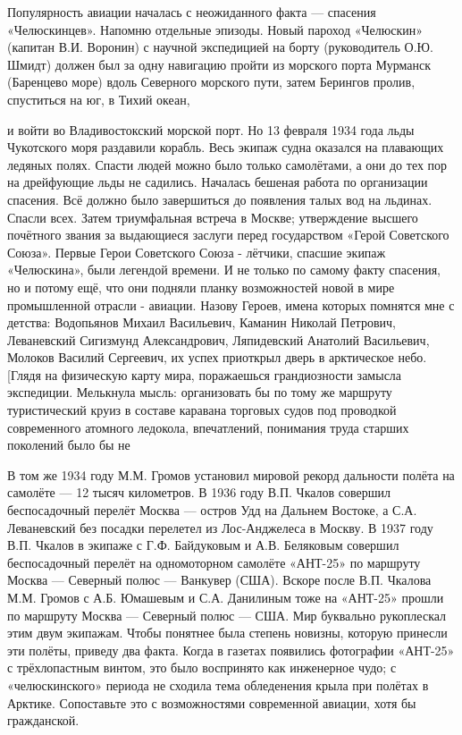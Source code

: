 Популярность авиации началась с неожиданного факта — спасения «Челюскинцев». Напомню отдельные эпизоды. Новый пароход «Челюскин» (капитан В.И. Воронин) с научной экспедицией на борту (руководитель О.Ю. Шмидт) должен был за одну навигацию пройти из морского порта Мурманск (Баренцево море) вдоль Северного морского пути, затем Берингов пролив, спуститься на юг, в Тихий океан,

\label{174-1}
и войти во Владивостокский морской порт. Но 13 февраля 1934 года льды Чукотского моря раздавили корабль. Весь экипаж судна оказался на плавающих ледяных полях. Спасти людей можно было только самолётами, а они до тех пор на дрейфующие льды не садились. Началась бешеная работа по организации спасения. Всё должно было завершиться до появления талых вод на льдинах. Спасли всех. Затем триумфальная встреча в Москве; утверждение высшего почётного звания за выдающиеся заслуги перед государством «Герой Советского Союза». Первые Герои Советского Союза - лётчики, спасшие экипаж «Челюскина», были легендой времени. И не только по самому факту спасения, но и потому ещё, что они подняли планку возможностей новой в мире промышленной отрасли - авиации. Назову Героев, имена которых помнятся мне с детства: Водопьянов Михаил Васильевич, Каманин Николай Петрович, Леваневский Сигизмунд Александрович, Ляпидевский Анатолий Васильевич, Молоков Василий Сергеевич, их успех приоткрыл дверь в арктическое небо. [Глядя на физическую карту мира, поражаешься грандиозности замысла экспедиции. Мелькнула мысль: организовать бы по тому же маршруту туристический круиз в составе каравана торговых судов под проводкой современного атомного ледокола, впечатлений, понимания труда старших поколений было бы не

\label{175-1}
В том же 1934 году М.М. Громов установил мировой рекорд дальности полёта на самолёте — 12 тысяч километров. В 1936 году В.П. Чкалов совершил беспосадочный перелёт Москва — остров Удд на Дальнем Востоке, а С.А. Леваневский без посадки перелетел из Лос-Анджелеса в Москву. В 1937 году В.П. Чкалов в экипаже с Г.Ф. Байдуковым и А.В. Беляковым совершил беспосадочный перелёт на одномоторном самолёте «АНТ-25» по маршруту Москва — Северный полюс — Ванкувер (США). Вскоре после В.П. Чкалова М.М. Громов с А.Б. Юмашевым и С.А. Данилиным тоже на «АНТ-25» прошли по маршруту Москва — Северный полюс — США. Мир буквально рукоплескал этим двум экипажам. Чтобы понятнее была степень новизны, которую принесли эти полёты, приведу два факта. Когда в газетах появились фотографии «АНТ-25» с трёхлопастным винтом, это было воспринято как инженерное чудо; с «челюскинского» периода не сходила тема обледенения крыла при полётах в Арктике. Сопоставьте это с возможностями современной авиации, хотя бы гражданской.

